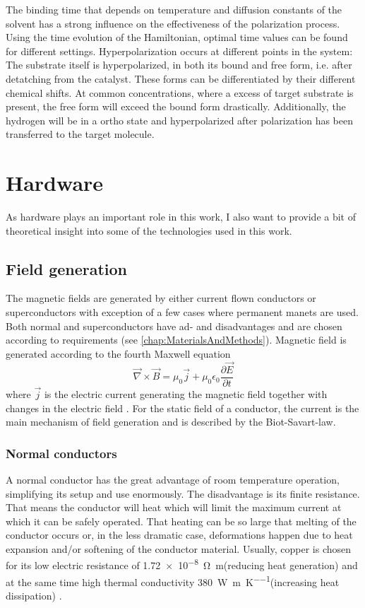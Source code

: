             The binding time that depends on temperature and diffusion constants of the solvent has a strong influence on the effectiveness of the polarization process. Using the time evolution of the Hamiltonian, optimal time values can be found for different settings.
            Hyperpolarization occurs at different points in the system: The substrate itself is hyperpolarized, in both its bound and free form, i.e. after detatching from the catalyst. These forms can be differentiated by their different chemical shifts. At common concentrations, where a excess of target substrate is present, the free form will exceed the bound form drastically. Additionally, the hydrogen will be in a ortho state and hyperpolarized after polarization has been transferred to the target molecule. 
        \section{Hardware}
            As hardware plays an important role in this work, I also want to provide a bit of theoretical insight into some of the technologies used in this work.
            \subsection{Field generation}
                The magnetic fields are generated by either current flown conductors or superconductors with exception of a few cases where permanent manets are used. Both normal and superconductors have ad- and disadvantages and are chosen according to requirements (see \ref{chap:MaterialsAndMethods}). Magnetic field is generated according to the fourth Maxwell equation
                \begin{equation}
                    \label{equation:theory:maxwell}
                    \vec\nabla\times\vec B = \mu_0\vec j+\mu_0\epsilon_0\frac{\partial\vec E}{\partial t}
                \end{equation}
                where $\vec j$ is the electric current generating the magnetic field together with changes in the electric field \cite{b.i._bleaney__b._bleaney_electricity_nodate}. For the static field of a conductor, the current is the main mechanism of field generation and is described by the Biot-Savart-law.
            \subsubsection{Normal conductors}
                A normal conductor has the great advantage of room temperature operation, simplifying its setup and use enormously. The disadvantage is  its finite resistance. That means the conductor will heat which will limit the maximum current at which it can be safely operated.  That heating can be so large that melting of the conductor occurs or, in the less dramatic case, deformations happen due to heat expansion and/or softening of the conductor material. Usually, copper is chosen for its low electric resistance of \SI{1.72e-8}{\ohm\meter}(reducing heat generation) and at the same time high thermal conductivity \SI{380}{\watt\per\m\per\kelvin}(increasing heat dissipation) \cite{schofield_f._h._thermal_1925}.

